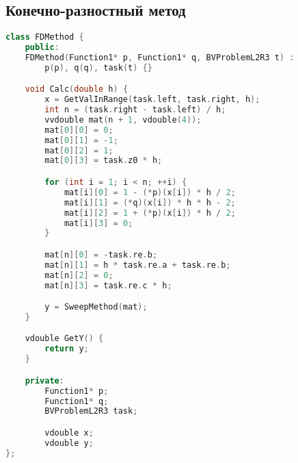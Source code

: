 \subsection*{Конечно-разностный метод}

\begin{lstlisting}[language=C++]
class FDMethod {
    public:
    FDMethod(Function1* p, Function1* q, BVProblemL2R3 t) :
        p(p), q(q), task(t) {}

    void Calc(double h) {
        x = GetValInRange(task.left, task.right, h);
        int n = (task.right - task.left) / h;
        vvdouble mat(n + 1, vdouble(4));
        mat[0][0] = 0;
        mat[0][1] = -1;
        mat[0][2] = 1;
        mat[0][3] = task.z0 * h;

        for (int i = 1; i < n; ++i) {
            mat[i][0] = 1 - (*p)(x[i]) * h / 2;
            mat[i][1] = (*q)(x[i]) * h * h - 2;
            mat[i][2] = 1 + (*p)(x[i]) * h / 2;
            mat[i][3] = 0;
        }

        mat[n][0] = -task.re.b;
        mat[n][1] = h * task.re.a + task.re.b;
        mat[n][2] = 0;
        mat[n][3] = task.re.c * h;

        y = SweepMethod(mat);
    }

    vdouble GetY() {
        return y;
    }

    private:
        Function1* p;
        Function1* q;
        BVProblemL2R3 task;

        vdouble x;
        vdouble y;
};
\end{lstlisting}

\pagebreak